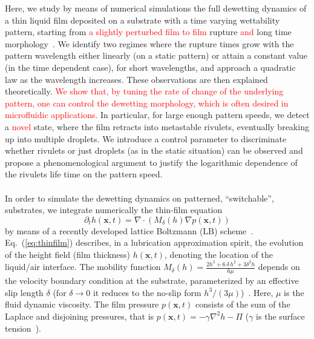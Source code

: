 \documentclass[amsmath,amssymb,showpacs,prf,superscriptaddress, longbibliography]{revtex4-1} %
\newcommand{\REV}[1]{\textcolor{red}{#1}}
\begin{document}
Here, we study by means of numerical simulations the full dewetting dynamics of a thin liquid film deposited on a substrate with a time varying wettability pattern, starting from \REV{a slightly perturbed film to film} rupture \REV{and} long time morphology~\cite{konnurInstabilityMorphologyThin2000}. 
We identify two regimes where the rupture times grow with the pattern wavelength either linearly (on a static pattern) or attain a constant value (in the time dependent case), for short wavelengths, and approach a quadratic law as the wavelength increases. 
These observations are then explained theoretically. 
\REV{We show that, by tuning the rate of change of the underlying pattern, one can control the dewetting morphology, which is often desired in microfluidic applications.} 
In particular, for large enough pattern speeds, we detect a \REV{novel} state, where the film retracts into metastable rivulets, eventually breaking up into multiple droplets.
We introduce a control parameter to discriminate whether rivulets or just droplets (as in the static situation)
can be observed and propose a phenomenological argument to justify the logarithmic dependence of the rivulets life time on the pattern speed.\\
\\
 In order to simulate the dewetting dynamics on patterned, ``switchable'', substrates, we integrate numerically the thin-film equation~\cite{oronLongscaleEvolutionThin1997, crasterDynamicsStabilityThin2009} 
\begin{equation}\label{eq:thinfilm}
    \partial_t h(\mathbf{x},t) = \nabla\cdot\left(M_{\delta}(h)\nabla p(\mathbf{x},t)\right)
\end{equation}
by means of a recently developed lattice Boltzmann (LB) scheme~\cite{zitzLatticeBoltzmannMethod2019,zitzLatticeBoltzmannSimulations2021, zitzSwalbeJlLattice2022a}.
Eq.~(\ref{eq:thinfilm}) describes, in a lubrication approximation spirit, the evolution of the height field (film thickness) $h(\mathbf{x},t)$, denoting the location of the liquid/air interface. 
The mobility function $M_{\delta}(h) = \frac{2h^3 + 6\,\delta\, h^2 + 3\delta^2h}{6\mu}$ depends on the velocity boundary condition at the substrate, parameterized by an effective slip length $\delta$ (for $\delta \rightarrow 0$ it reduces to the no-slip form $h^3/(3\mu)$)~\cite{huhHydrodynamicModelSteady1971, peschkaSignaturesSlipDewetting2019, fetzerQuantifyingHydrodynamicSlip2007, munchLubricationModelsSmall2005a}. 
Here, $\mu$ is the fluid dynamic viscosity.
The film pressure $p(\mathbf{x},t)$ consists of the sum of the Laplace and disjoining pressures, that is $p(\mathbf{x},t) = -\gamma \nabla^2 h - \Pi$ ($\gamma$ is the surface tension~\cite{wuHowChemicalPatterns2020}).
\end{document}
